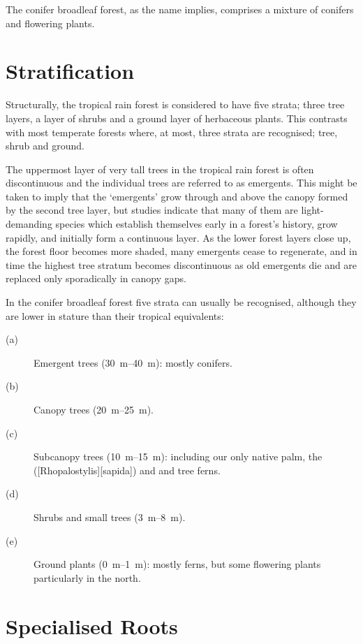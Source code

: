 The conifer broadleaf forest, as the name implies, comprises a mixture of conifers and flowering plants.

\section{Stratification}

Structurally, the tropical rain forest is considered to have five strata; three tree layers, a layer of shrubs and a ground layer of herbaceous plants.
This contrasts with most temperate forests where, at most, three strata are recognised; tree, shrub and ground.

The uppermost layer of very tall trees in the tropical rain forest is often discontinuous and the individual trees are referred to as emergents.
This might be taken to imply that the `emergents' grow through and above the canopy formed by the second tree layer, but studies indicate that many of them are light-demanding species which establish themselves early in a forest's history, grow rapidly, and initially form a continuous layer.
As the lower forest layers close up, the forest floor becomes more shaded, many emergents cease to regenerate, and in time the highest tree stratum becomes discontinuous as old emergents die and are replaced only sporadically in canopy gaps.

In the conifer broadleaf forest five strata can usually be recognised, although they are lower in stature than their tropical equivalents:
\begin{description}
	\item[{(a)}]Emergent trees (\SIrange{30}{40}{\metre}): mostly conifers.
	\item[{(b)}]Canopy trees (\SIrange{20}{25}{\metre}).
	\item[{(c)}]Subcanopy trees (\SIrange{10}{15}{\metre}): including our only native palm, the  ([Rhopalostylis][sapida]) and  and  tree ferns.
	\item[{(d)}]Shrubs and small trees (\SIrange{3}{8}{\metre}).
	\item[{(e)}]Ground plants (\SIrange{0}{1}{\metre}): mostly ferns, but some flowering plants particularly in the north.
\end{description}
\section{Specialised Roots}

